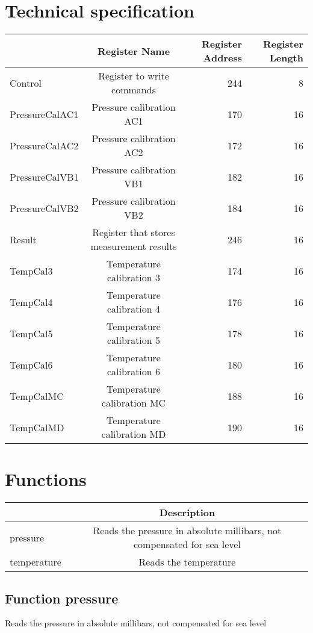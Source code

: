 \documentclass[a4paper,12pt,oneside,pdflatex,italian,final,twocolumn]{article}
\begin{document}
\section{Technical specification}
\centering
\begin{tabular}{lcrr}
\toprule
 & Register Name & Register Address & Register Length \\
\midrule
Control & Register to write commands & 244 & 8 \\
PressureCalAC1 & Pressure calibration AC1 & 170 & 16 \\
PressureCalAC2 & Pressure calibration AC2 & 172 & 16 \\
PressureCalVB1 & Pressure calibration VB1 & 182 & 16 \\
PressureCalVB2 & Pressure calibration VB2 & 184 & 16 \\
Result & Register that stores measurement results & 246 & 16 \\
TempCal3 & Temperature calibration 3 & 174 & 16 \\
TempCal4 & Temperature calibration 4 & 176 & 16 \\
TempCal5 & Temperature calibration 5 & 178 & 16 \\
TempCal6 & Temperature calibration 6 & 180 & 16 \\
TempCalMC & Temperature calibration MC & 188 & 16 \\
TempCalMD & Temperature calibration MD & 190 & 16 \\
\bottomrule
\end{tabular}


\raggedright

\section{Functions}

\centering
\begin{tabular}{lc}
\toprule
  & Description \\
\midrule
pressure & Reads the pressure in absolute millibars,
not compensated for sea level
 \\
temperature & Reads the temperature \\
\bottomrule
\end{tabular}


\raggedright
\subsection{Function pressure }
Reads the pressure in absolute millibars,
not compensated for sea level
 \\
\end{document}
